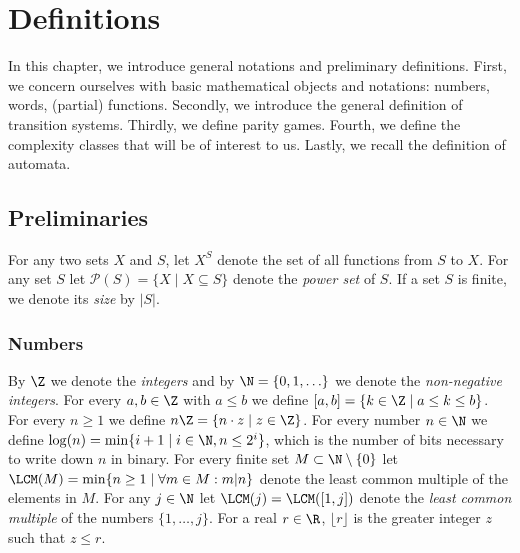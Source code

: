 
\chapter{Definitions}\label{chapter definitions}



In this chapter, we introduce general notations and preliminary definitions.
First, we concern ourselves with basic mathematical objects and notations: 
numbers, words, (partial) functions.
Secondly, we introduce the general definition of transition systems.
Thirdly, we %
	define parity games.
Fourth, %
	we %
	define the complexity classes that will be of interest to us. 
Lastly, %
	we recall the definition of automata.

\section{Preliminaries}

For any two sets $X$ and $S$, let $X^S$ denote the set of all functions from $S$ to $X$.
For any set $S$ let 
$\mathscr{P}(S) = \{ X \mid X \subseteq S \}$
denote the {\em power set} of $S$.
If a set $S$ is finite, we denote its {\em size} by $|S|$.


\subsection{Numbers}

By $\Z $ we denote the {\em integers} and by $\N=\{0,1,\ldots\}$ we denote the {\em non-negative integers}.
For every $a,b\in\Z$ with $a\leq b$ we define $[a,b]=\{k\in\Z\mid a\leq k\leq b\}$.
For every $n\geq 1$ we define $n\Z=\{n\cdot z\mid z\in\Z\}$.
For every number $n\in\N$ we define $\log(n)=\min\{i+1\mid i\in\N, n\leq 2^i\}$,
which is the 
number of bits necessary to write down $n$ in binary.
For every finite set $M\subset\N\setminus\{0\}$ let 
$\LCM(M)=\min\{n\geq 1\mid \forall m\in M: m | n\}$
denote the least common multiple of the elements in $M$. 
For any $j \in \N$ let 
$\LCM(j)=\LCM([1,j])$ denote the 
{\em least  common multiple} of the numbers $\{1,\ldots,j\}$.
For a real $r \in \R$, $\lfloor r \rfloor$ is the greater integer $z$ such that $z \leq r$.

